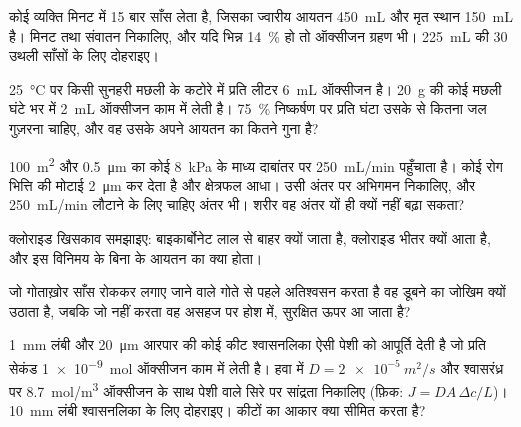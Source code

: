 \begin{exercise}[$\star\star$]\label{exo:b1:gas-exchange:5}
कोई व्यक्ति मिनट में \qty{15}{} बार साँस लेता है, जिसका ज्वारीय आयतन
\qty{450}{mL} और मृत स्थान \qty{150}{mL} है। मिनट तथा
 संवातन निकालिए, और यदि  भिन्न \qty{14}{\%} हो तो
ऑक्सीजन ग्रहण भी। \qty{225}{mL} की \qty{30}{} उथली साँसों के लिए दोहराइए।
\end{exercise}

\begin{exercise}[$\star\star$]\label{exo:b1:gas-exchange:6}
\qty{25}{\celsius} पर किसी सुनहरी मछली के कटोरे में प्रति लीटर
\qty{6}{mL} ऑक्सीजन है। \qty{20}{g} की कोई मछली घंटे भर में \qty{2}{mL}
ऑक्सीजन काम में लेती है। \qty{75}{\%} निष्कर्षण पर प्रति घंटा उसके
 से कितना जल गुज़रना चाहिए, और वह उसके अपने आयतन का कितने गुना है?
\end{exercise}

\begin{exercise}[$\star\star$]\label{exo:b1:gas-exchange:7}
\qty{100}{m^2} और \qty{0.5}{\micro m} का कोई  \qty{8}{kPa} के
माध्य दाबांतर पर \qty{250}{mL/min} पहुँचाता है। कोई रोग भित्ति की मोटाई
\qty{2}{\micro m} कर देता है और क्षेत्रफल आधा। उसी अंतर पर अभिगमन
निकालिए, और \qty{250}{mL/min} लौटाने के लिए चाहिए अंतर भी। शरीर वह अंतर
यों ही क्यों नहीं बढ़ा सकता?
\end{exercise}

\begin{exercise}[$\star\star$]\label{exo:b1:gas-exchange:8}
क्लोराइड खिसकाव समझाइए: बाइकार्बोनेट लाल  से बाहर क्यों जाता है,
क्लोराइड भीतर क्यों आता है, और इस विनिमय के बिना  के आयतन का क्या
होता।
\end{exercise}

\begin{exercise}[$\star\star$]\label{exo:b1:gas-exchange:9}
जो गोताख़ोर साँस रोककर लगाए जाने वाले गोते से पहले अतिश्वसन करता है वह
डूबने का जोखिम क्यों उठाता है, जबकि जो नहीं करता वह असहज पर होश में,
सुरक्षित ऊपर आ जाता है?
\end{exercise}

\begin{exercise}[$\star\star\star$]\label{exo:b1:gas-exchange:10}
\qty{1}{mm} लंबी और \qty{20}{\micro m} आरपार की कोई कीट श्वासनलिका ऐसी
पेशी को आपूर्ति देती है जो प्रति सेकंड \qty{1e-9}{mol} ऑक्सीजन काम में
लेती है। हवा में $D = \qty{2e-5}{m^2/s}$ और श्वासरंध्र पर
\qty{8.7}{mol/m^3} ऑक्सीजन के साथ पेशी वाले सिरे पर सांद्रता निकालिए (फ़िक:
$J = DA\,\Delta c/L$)। \qty{10}{mm} लंबी श्वासनलिका के लिए दोहराइए।
कीटों का आकार क्या सीमित करता है?
\end{exercise}

